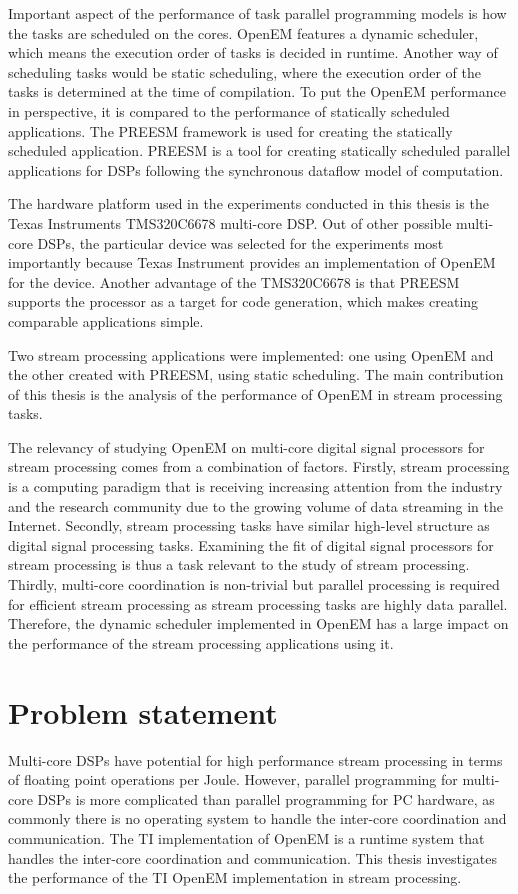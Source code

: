 Important aspect of the performance of task parallel programming models is how the tasks are scheduled on the cores. OpenEM features a dynamic scheduler, which means the execution order of tasks is decided in runtime. Another way of scheduling tasks would be static scheduling, where the execution order of the tasks is determined at the time of compilation. To put the OpenEM performance in perspective, it is compared to the performance of statically scheduled applications. The PREESM framework is used for creating the statically scheduled application. PREESM is a tool for creating statically scheduled parallel applications for DSPs following the synchronous dataflow model of computation.

The hardware platform used in the experiments conducted in this thesis is the Texas Instruments TMS320C6678 multi-core DSP. Out of other possible multi-core DSPs, the particular device was selected for the experiments most importantly because Texas Instrument provides an implementation of OpenEM for the device. Another advantage of the TMS320C6678 is that PREESM supports the processor as a target for code generation, which makes creating comparable applications simple.

Two stream processing applications were implemented: one using OpenEM and the other created with PREESM, using static scheduling. The main contribution of this thesis is the analysis of the performance of OpenEM in stream processing tasks.

The relevancy of studying OpenEM on multi-core digital signal processors for stream processing comes from a combination of factors. Firstly, stream processing is a computing paradigm that is receiving increasing attention from the industry and the research community due to the growing volume of data streaming in the Internet. Secondly, stream processing tasks have similar high-level structure as digital signal processing tasks. Examining the fit of digital signal processors for stream processing is thus a task relevant to the study of stream processing. Thirdly, multi-core coordination is non-trivial but parallel processing is required for efficient stream processing as stream processing tasks are highly data parallel. Therefore, the dynamic scheduler implemented in OpenEM has a large impact on the performance of the stream processing applications using it.

\section{Problem statement}
\label{section:problem-statement}
Multi-core DSPs have potential for high performance stream processing in terms of floating point operations per Joule. However, parallel programming for multi-core DSPs is more complicated than parallel programming for PC hardware, as commonly there is no operating system to handle the inter-core coordination and communication. The TI implementation of OpenEM is a runtime system that handles the inter-core coordination and communication. This thesis investigates the performance of the TI OpenEM implementation in stream processing.

